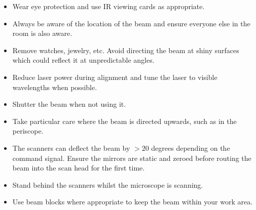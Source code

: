 \documentclass[a4paper]{report}
\begin{document}
\begin{itemize}
    \item Wear eye protection and use IR viewing cards as appropriate.
    \item Always be aware of the location of the beam and ensure everyone else in the room is also aware.
    \item Remove watches, jewelry, etc. Avoid directing the beam at shiny surfaces which could reflect it at unpredictable angles.
    \item Reduce laser power during alignment and tune the laser to visible wavelengths when possible.
    \item Shutter the beam when not using it. 
    \item Take particular care where the beam is directed upwards, such as in the periscope. 
    \item The scanners can deflect the beam by $>20$ degrees depending on the command signal. Ensure the mirrors are static and zeroed before routing the beam into the scan head for the first time. 
    \item Stand behind the scanners whilst the microscope is scanning.
    \item Use beam blocks where appropriate to keep the beam within your work area.
\end{itemize}

\clearpage
\end{document}
